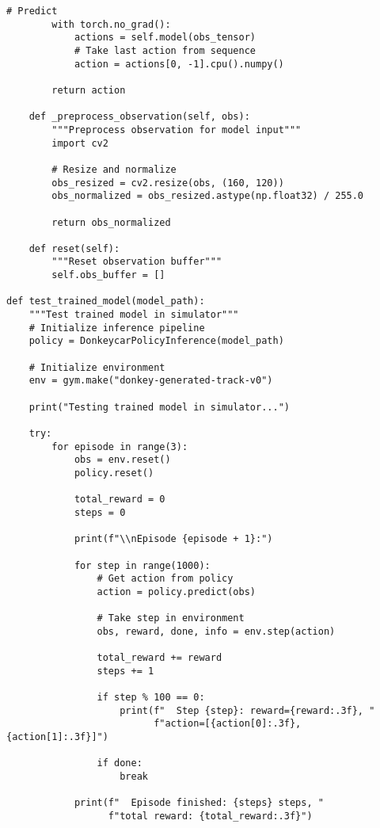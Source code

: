 \documentclass[11pt,a4paper]{article}
\begin{document}
\begin{lstlisting}[style=pythonstyle, caption={Model deployment utilities (deploy\_model.py)}]
        # Predict
        with torch.no_grad():
            actions = self.model(obs_tensor)
            # Take last action from sequence
            action = actions[0, -1].cpu().numpy()
        
        return action
    
    def _preprocess_observation(self, obs):
        """Preprocess observation for model input"""
        import cv2
        
        # Resize and normalize
        obs_resized = cv2.resize(obs, (160, 120))
        obs_normalized = obs_resized.astype(np.float32) / 255.0
        
        return obs_normalized
    
    def reset(self):
        """Reset observation buffer"""
        self.obs_buffer = []

def test_trained_model(model_path):
    """Test trained model in simulator"""
    # Initialize inference pipeline
    policy = DonkeycarPolicyInference(model_path)
    
    # Initialize environment
    env = gym.make("donkey-generated-track-v0")
    
    print("Testing trained model in simulator...")
    
    try:
        for episode in range(3):
            obs = env.reset()
            policy.reset()
            
            total_reward = 0
            steps = 0
            
            print(f"\\nEpisode {episode + 1}:")
            
            for step in range(1000):
                # Get action from policy
                action = policy.predict(obs)
                
                # Take step in environment
                obs, reward, done, info = env.step(action)
                
                total_reward += reward
                steps += 1
                
                if step % 100 == 0:
                    print(f"  Step {step}: reward={reward:.3f}, "
                          f"action=[{action[0]:.3f}, {action[1]:.3f}]")
                
                if done:
                    break
            
            print(f"  Episode finished: {steps} steps, "
                  f"total reward: {total_reward:.3f}")
    

\end{lstlisting}
\end{document}
